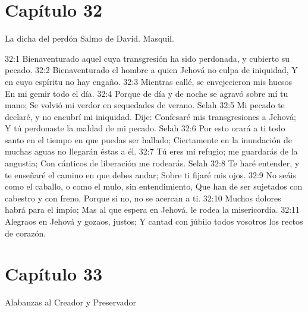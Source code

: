 \section*{Capítulo 32}
La dicha del perdón 
Salmo de David. Masquil. 

32:1 Bienaventurado aquel cuya transgresión ha sido perdonada, y cubierto su pecado. 
32:2 Bienaventurado el hombre a quien Jehová no culpa de iniquidad, 
Y en cuyo espíritu no hay engaño. 
32:3 Mientras callé, se envejecieron mis huesos 
En mi gemir todo el día. 
32:4 Porque de día y de noche se agravó sobre mí tu mano; 
Se volvió mi verdor en sequedades de verano. Selah 
32:5 Mi pecado te declaré, y no encubrí mi iniquidad. 
Dije: Confesaré mis transgresiones a Jehová; 
Y tú perdonaste la maldad de mi pecado.  Selah 
32:6 Por esto orará a ti todo santo en el tiempo en que puedas ser hallado; 
Ciertamente en la inundación de muchas aguas no llegarán éstas a él. 
32:7 Tú eres mi refugio; me guardarás de la angustia; 
Con cánticos de liberación me rodearás. Selah 
32:8 Te haré entender, y te enseñaré el camino en que debes andar; 
Sobre ti fijaré mis ojos. 
32:9 No seáis como el caballo, o como el mulo, sin entendimiento, 
Que han de ser sujetados con cabestro y con freno, 
Porque si no, no se acercan a ti. 
32:10 Muchos dolores habrá para el impío; 
Mas al que espera en Jehová, le rodea la misericordia. 
32:11 Alegraos en Jehová y gozaos, justos; 
Y cantad con júbilo todos vosotros los rectos de corazón. 
\section*{Capítulo 33}
Alabanzas al Creador y Preservador 

